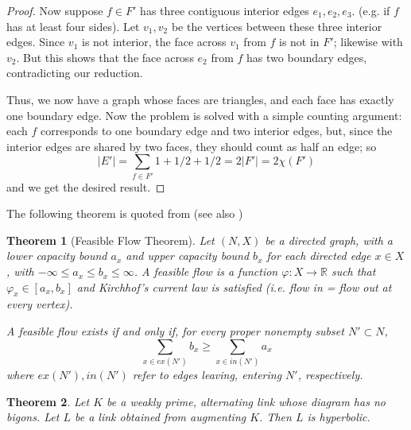 \documentclass[11pt]{amsart}
\newcommand{\RR}{\mathbb{R}}
\newcommand{\vphi}{\varphi}
\theoremstyle{plain}
\newtheorem{theorem}{Theorem}[section]
\theoremstyle{definition}
\begin{document}
\begin{proof}
Now suppose $f\in F'$ has three contiguous interior edges
$e_1,e_2,e_3$.
(e.g. if $f$ has at least four sides).
Let $v_1, v_2$ be the vertices between these three interior edges.
Since $v_1$ is not interior,
the face across $v_1$ from $f$ is not in $F'$;
likewise with $v_2$.
But this shows that the face across $e_2$ from $f$
has two boundary edges, contradicting our reduction.


Thus, we now have a graph whose faces are triangles,
and each face has exactly one boundary edge.
Now the problem is solved with a simple counting argument:
each $f$ corresponds to one boundary edge and two interior edges,
but, since the interior edges are shared by two faces,
they should count as half an edge; so
\[
 |E'| = \sum_{f\in F'} 1 + 1/2 + 1/2 = 2|F'| = 2\chi(F')
\]
and we get the desired result.
\end{proof}


The following theorem is quoted from \cite{BandS}
(see also \cite{FF})

\begin{theorem}[Feasible Flow Theorem]
\label{t:feasible_flow}
Let $(N,X)$ be a directed graph,
with a \emph{lower capacity bound} $a_x$
and \emph{upper capacity bound} $b_x$
for each directed edge $x \in X$,
with $-\infty \leq a_x \leq b_x \leq \infty$.
A \emph{feasible flow} is a function $\vphi : X \to \RR$
such that $\vphi_x \in [a_x, b_x]$ and
Kirchhof's current law is satisfied
(i.e. flow in = flow out at every vertex).

A feasible flow exists if and only if,
for every proper nonempty subset $N' \subset N$,
\[
\sum_{x \in ex(N')} b_x \geq \sum_{x \in in(N')} a_x
\]
where $ex(N'), in(N')$ refer to edges leaving,
entering $N'$, respectively.
\end{theorem}



\begin{theorem}
\label{t:auglink_hyp}
Let $K$ be a weakly prime, alternating link whose diagram has no bigons.
Let $L$ be a link obtained from augmenting $K$.
Then $L$ is hyperbolic.
\end{theorem}
\end{document}
